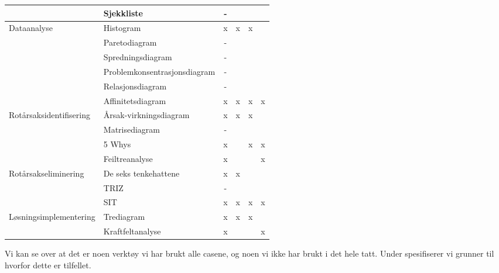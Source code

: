 \begin{table}[htbp]
\begin{tabular}{|l|l|c|r|r|r|}
\cline{2-6}          & Sjekkliste & -     &       &       &  \\
    \hline
    \multicolumn{1}{|l|}{\multirow{6}[12]{*}{Dataanalyse}} & Histogram & x     & \multicolumn{1}{c|}{x} & \multicolumn{1}{c|}{x} &  \\
\cline{2-6}          & Paretodiagram & -    &       &        &  \\
\cline{2-6}          & Spredningsdiagram & -     &       &       &  \\
\cline{2-6}          & Problemkonsentrasjonsdiagram & -     &       &       &  \\
\cline{2-6}          & Relasjonsdiagram & -    &       &        &  \\
\cline{2-6}          & Affinitetsdiagram & x     & \multicolumn{1}{c|}{x} & \multicolumn{1}{c|}{x} & \multicolumn{1}{c|}{x} \\
    \hline
    \multicolumn{1}{|l|}{\multirow{4}[8]{*}{Rotårsaksidentifisering}} & Årsak-virkningsdiagram & x     & \multicolumn{1}{c|}{x} & \multicolumn{1}{c|}{x} &  \\
\cline{2-6}          & Matrisediagram & -     &       &       &  \\
\cline{2-6}          & 5 Whys & x     &       & \multicolumn{1}{c|}{x} & \multicolumn{1}{c|}{x} \\
\cline{2-6}          & Feiltreanalyse & x     &       &       & \multicolumn{1}{c|}{x} \\
    \hline
    \multicolumn{1}{|l|}{\multirow{3}[6]{*}{Rotårsakseliminering}} & De seks tenkehattene & x     & \multicolumn{1}{c|}{x} &     &  \\
\cline{2-6}          & TRIZ  & -     &       &       &  \\
\cline{2-6}          & SIT   & x     & \multicolumn{1}{c|}{x} & \multicolumn{1}{c|}{x} & \multicolumn{1}{c|}{x} \\
    \hline
    \multicolumn{1}{|l|}{\multirow{2}[4]{*}{Løsningsimplementering}} & Trediagram & x     & \multicolumn{1}{c|}{x} & \multicolumn{1}{c|}{x} &  \\
\cline{2-6}          & Kraftfeltanalyse & x     &       &       & \multicolumn{1}{c|}{x} \\
    \hline
    \end{tabular}%
  \label{tab:verktoymatrise}%
\end{table}%

Vi kan se over at det er noen verktøy vi har brukt alle casene, og noen vi ikke har brukt i det hele tatt. Under spesifiserer vi grunner til hvorfor dette er tilfellet.

